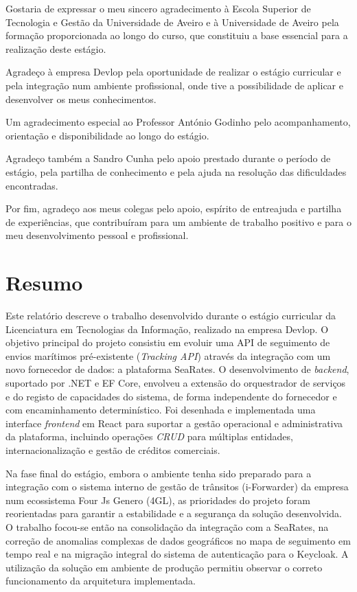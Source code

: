 \documentclass[a4paper,12pt]{report}
\begin{document}
Gostaria de expressar o meu sincero agradecimento à Escola Superior de Tecnologia e Gestão da Universidade de Aveiro e à Universidade de Aveiro pela formação proporcionada ao longo do curso, que constituiu a base essencial para a realização deste estágio.

Agradeço à empresa Devlop pela oportunidade de realizar o estágio curricular e pela integração num ambiente profissional, onde tive a possibilidade de aplicar e desenvolver os meus conhecimentos.

Um agradecimento especial ao Professor António Godinho pelo acompanhamento, orientação e disponibilidade ao longo do estágio.

Agradeço também a Sandro Cunha pelo apoio prestado durante o período de estágio, pela partilha de conhecimento e pela ajuda na resolução das dificuldades encontradas.

Por fim, agradeço aos meus colegas pelo apoio, espírito de entreajuda e partilha de experiências, que contribuíram para um ambiente de trabalho positivo e para o meu desenvolvimento pessoal e profissional.

\newpage

\chapter*{Resumo}

Este relatório descreve o trabalho desenvolvido durante o estágio curricular da Licenciatura em Tecnologias da Informação, realizado na empresa Devlop. O objetivo principal do projeto consistiu em evoluir uma API de seguimento de envios marítimos pré-existente (\textit{Tracking API}) através da integração com um novo fornecedor de dados: a plataforma SeaRates. O desenvolvimento de \textit{backend}, suportado por .NET e EF Core, envolveu a extensão do orquestrador de serviços e do registo de capacidades do sistema, de forma independente do fornecedor e com encaminhamento determinístico. Foi desenhada e implementada uma interface \textit{frontend} em React para suportar a gestão operacional e administrativa da plataforma, incluindo operações \textit{CRUD} para múltiplas entidades, internacionalização e gestão de créditos comerciais.

Na fase final do estágio, embora o ambiente tenha sido preparado para a integração com o sistema interno de gestão de trânsitos (i-Forwarder) da empresa num ecossistema Four Js Genero (4GL), as prioridades do projeto foram reorientadas para garantir a estabilidade e a segurança da solução desenvolvida. O trabalho focou-se então na consolidação da integração com a SeaRates, na correção de anomalias complexas de dados geográficos no mapa de seguimento em tempo real e na migração integral do sistema de autenticação para o Keycloak. A utilização da solução em ambiente de produção permitiu observar o correto funcionamento da arquitetura implementada.
\end{document}
